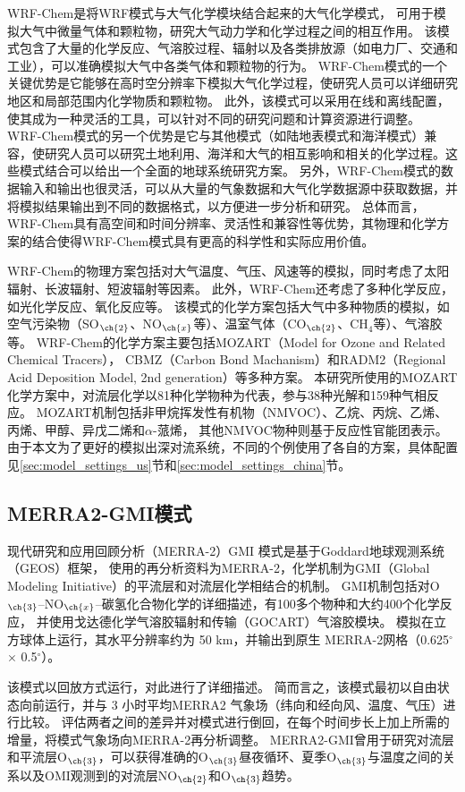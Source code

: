 WRF-Chem是将WRF模式与大气化学模块结合起来的大气化学模式，
可用于模拟大气中微量气体和颗粒物，研究大气动力学和化学过程之间的相互作用。
该模式包含了大量的化学反应、气溶胶过程、辐射以及各类排放源（如电力厂、交通和工业），可以准确模拟大气中各类气体和颗粒物的行为。
WRF-Chem模式的一个关键优势是它能够在高时空分辨率下模拟大气化学过程，使研究人员可以详细研究地区和局部范围内化学物质和颗粒物。
此外，该模式可以采用在线和离线配置，使其成为一种灵活的工具，可以针对不同的研究问题和计算资源进行调整。
WRF-Chem模式的另一个优势是它与其他模式（如陆地表模式和海洋模式）兼容，使研究人员可以研究土地利用、海洋和大气的相互影响和相关的化学过程。这些模式结合可以给出一个全面的地球系统研究方案。
另外，WRF-Chem模式的数据输入和输出也很灵活，可以从大量的气象数据和大气化学数据源中获取数据，并将模拟结果输出到不同的数据格式，以方便进一步分析和研究。
总体而言，WRF-Chem具有高空间和时间分辨率、灵活性和兼容性等优势，其物理和化学方案的结合使得WRF-Chem模式具有更高的科学性和实际应用价值。

WRF-Chem的物理方案包括对大气温度、气压、风速等的模拟，同时考虑了太阳辐射、长波辐射、短波辐射等因素。
此外，WRF-Chem还考虑了多种化学反应，如光化学反应、氧化反应等。
该模式的化学方案包括大气中多种物质的模拟，如空气污染物（SO$_{\ch{2}}$、NO$_{\ch{x}}$等）、温室气体（CO$_{\ch{2}}$、CH$_4$等）、气溶胶等。
WRF-Chem的化学方案主要包括MOZART（Model for Ozone and Related Chemical Tracers），
CBMZ（Carbon Bond Machanism）和RADM2（Regional Acid Deposition Model, 2nd generation）等多种方案。
本研究所使用的MOZART化学方案中，对流层化学以81种化学物种为代表，参与38种光解和159种气相反应\citep{Emmons.2010}。
MOZART机制包括非甲烷挥发性有机物（NMVOC）、乙烷、丙烷、乙烯、丙烯、甲醇、异戊二烯和$\alpha$-蒎烯，
其他NMVOC物种则基于反应性官能团表示。
由于本文为了更好的模拟出深对流系统，不同的个例使用了各自的方案，具体配置见\ref{sec:model_settings_us}节和\ref{sec:model_settings_china}节。



\subsection{MERRA2-GMI模式}

现代研究和应用回顾分析（MERRA-2）GMI 模式是基于Goddard地球观测系统（GEOS）框架\citep{Molod.2015}，
使用的再分析资料为MERRA-2\citep{Gelaro.2017}，化学机制为GMI（Global Modeling Initiative）的平流层和对流层化学相结合的机制\citep{Duncan.2007,Oman.2013,Nielsen.2017}。
GMI机制包括对O$_{\ch{3}}$--NO$_{\ch{x}}$--碳氢化合物化学的详细描述，有100多个物种和大约400个化学反应，
并使用戈达德化学气溶胶辐射和传输（GOCART）气溶胶模块。
模拟在立方球体上运行，其水平分辨率约为 50 km，并输出到原生 MERRA-2网格（0.625$^{\circ}$ $\times$ 0.5$^{\circ}$）。

该模式以回放方式运行，\citet{Orbe.2017}对此进行了详细描述。
简而言之，该模式最初以自由状态向前运行，并与 3 小时平均MERRA2 气象场（纬向和经向风、温度、气压）进行比较。
评估两者之间的差异并对模式进行倒回，在每个时间步长上加上所需的增量，将模式气象场向MERRA-2再分析调整。
MERRA2-GMI曾用于研究对流层和平流层O$_{\ch{3}}$，可以获得准确的O$_{\ch{3}}$昼夜循环、夏季O$_{\ch{3}}$与温度之间的关系以及OMI观测到的对流层NO$_{\ch{2}}$和O$_{\ch{3}}$趋势\citep{Strode.2017,Ziemke.2017,Ziemke.2019}。
